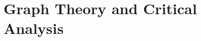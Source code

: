 
%
%
%
%
%
%
%
%
%



\section{Graph Theory and Critical Analysis} \label{Module1:GraphTheoryCriticalAnalysis}

